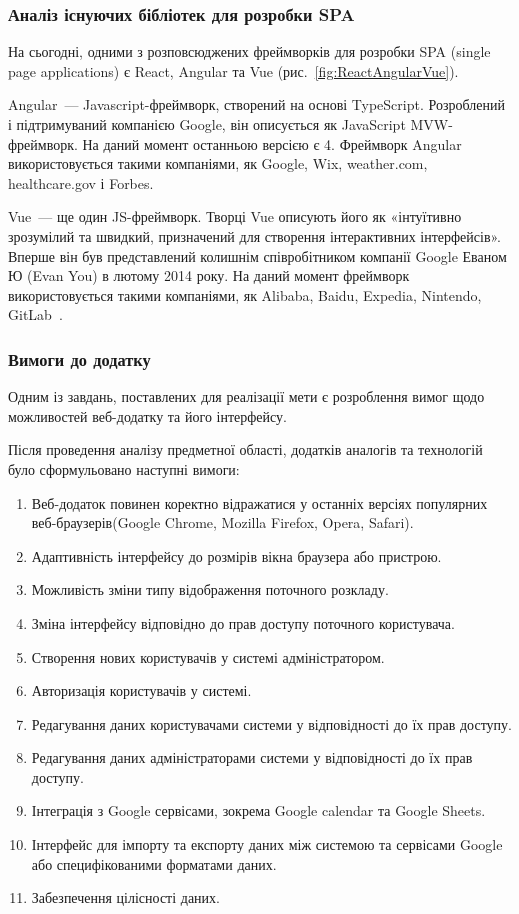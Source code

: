 \subsubsection{Аналіз існуючих бібліотек для розробки SPA}

На сьогодні, одними з розповсюджених фреймворків для розробки SPA (single page applications) є React, Angular та Vue (рис.~\ref{fig:ReactAngularVue}).


Angular~--- Javascript-фреймворк, створений на основі TypeScript. Розроблений і підтримуваний компанією Google, він описується як JavaScript MVW-фреймворк. На даний момент останньою версією є 4. Фреймворк Angular використовується такими компаніями, як Google, Wix, weather.com, healthcare.gov і Forbes.

\label{subs:vue}
Vue~--- ще один JS-фреймворк. Творці Vue описують його як «інтуїтивно зрозумілий та швидкий, призначений для створення інтерактивних інтерфейсів». Вперше він був представлений колишнім співробітником компанії Google Еваном Ю (Evan You) в лютому 2014 року. На даний момент фреймворк використовується такими компаніями, як Alibaba, Baidu, Expedia, Nintendo, GitLab~\cite{emmitscott2015}.

\subsubsection{Вимоги до додатку}

Одним із завдань, поставлених для реалізації мети є розроблення вимог щодо можливостей веб-додатку та його інтерфейсу.

Після проведення аналізу предметної області, додатків аналогів та технологій було сформульовано наступні вимоги:

\begin{enumerate}
    \item Веб-додаток повинен коректно відражатися у останніх версіях популярних веб-браузерів(Google Chrome, Mozilla Firefox, Opera, Safari).
    \item Адаптивність інтерфейсу до розмірів вікна браузера або пристрою.
    \item Можливість зміни типу відображення поточного розкладу.
    \item Зміна інтерфейсу відповідно до прав доступу поточного користувача.
    \item Створення нових користувачів у системі адміністратором.
    \item Авторизація користувачів у системі.
    \item Редагування даних користувачами системи у відповідності до їх прав доступу.
    \item Редагування даних адміністраторами системи у відповідності до їх прав доступу.
    \item Інтеграція з Google сервісами, зокрема Google calendar та Google Sheets.
    \item Інтерфейс для імпорту та експорту даних між системою та сервісами Google або специфікованими форматами даних.
    \item Забезпечення цілісності даних.
\end{enumerate}



